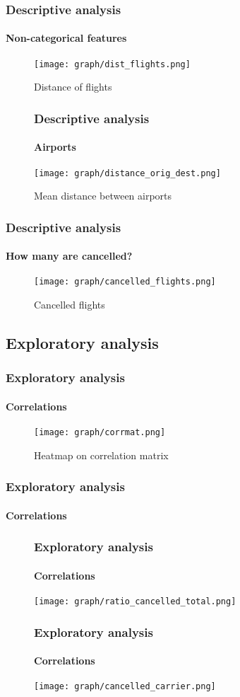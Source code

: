 \documentclass{beamer}
\begin{document}
	\begin{frame}
		\frametitle{Descriptive analysis}
		\framesubtitle{Non-categorical features}
		\begin{figure}
	      \texttt{[image: graph/dist\_flights.png]}
	      \caption{Distance of flights}
	      \label{fig:graph1}
	    \end{figure}\newline
	\end{frame}
	\begin{frame}
		\begin{figure}
			\frametitle{Descriptive analysis}
			\framesubtitle{Airports}
		  \texttt{[image: graph/distance\_orig\_dest.png]}
		  \caption{Mean distance between airports}
		  \label{fig:graph1}
		\end{figure}\newline
	\end{frame}
	\begin{frame}
		\frametitle{Descriptive analysis}
		\framesubtitle{How many are cancelled?}
		\begin{figure}
	      \texttt{[image: graph/cancelled\_flights.png]}
	      \caption{Cancelled flights}
	      \label{fig:graph1}
	    \end{figure}\newline
	\end{frame}
	\begin{frame}
		\section[Section]{Exploratory analysis}
		\frametitle{Exploratory analysis}
		\framesubtitle{Correlations}
		\begin{figure}
	      \texttt{[image: graph/corrmat.png]}
	      \caption{Heatmap on correlation matrix}
	      \label{fig:graph1}
	    \end{figure}
	\end{frame}
	\begin{frame}
		\frametitle{Exploratory analysis}
		\framesubtitle{Correlations}
		\begin{figure}[L]
			\frametitle{Exploratory analysis}
		 	\framesubtitle{Correlations}
	     	\texttt{[image: graph/ratio\_cancelled\_total.png]}
	     	\label{fig:graph1}
	    \end{figure}\newline
		\begin{figure}[R]
			\frametitle{Exploratory analysis}
		 	\framesubtitle{Correlations}
	     	\texttt{[image: graph/cancelled\_carrier.png]}
	     	\label{fig:graph1}
	    \end{figure}\newline
	\end{frame}
\end{document}
